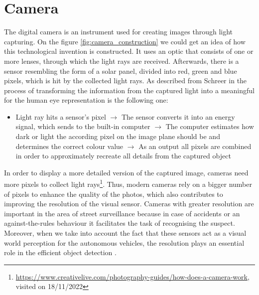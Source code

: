 \section{Camera}\label{camera_section}
The digital camera is an instrument used for creating images through light capturing. On the figure \ref{fig:camera_construction} we could get an idea of how this technological invention is constructed. It uses an optic that consists of one or more lenses, through which the light rays are received. Afterwards, there is a sensor resembling the form of a solar panel, divided into red, green and blue pixels, which is hit by the collected light rays. As described from Schreer in \cite{camera_pinhole_model} the process of transforming the information from the captured light into a meaningful for the human eye representation is the following one: 
\begin{itemize}
    \item Light ray hits a sensor's pixel $\rightarrow$ The sensor converts it into an energy signal, which sends to the built-in computer $\rightarrow$ The computer estimates how dark or light the according pixel on the image plane should be and determines the correct colour value $\rightarrow$ As an output all pixels are combined in order to approximately recreate all details from the captured object  
\end{itemize}

In order to display a more detailed version of the captured image, cameras need more pixels to collect light rays\footnote{\url{https://www.creativelive.com/photography-guides/how-does-a-camera-work}, visited on 18/11/2022}. Thus, modern cameras rely on a bigger number of pixels to enhance the quality of the photos, which also contributes to improving the resolution of the visual sensor. Cameras with greater resolution are important in the area of street surveillance because in case of accidents or an against-the-rules behaviour it facilitates the task of recognising the suspect. Moreover, when we take into account the fact that these sensors act as a visual world perception for the autonomous vehicles, the resolution plays an essential role in the efficient object detection \cite{resolution_importance}. 


